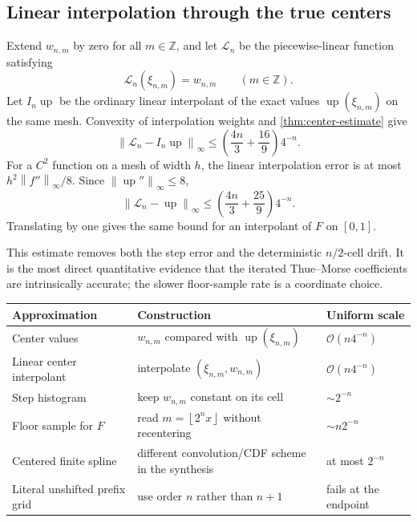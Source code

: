 \documentclass[11pt,oneside]{article}
\theoremstyle{definition}
\theoremstyle{remark}
\newcommand{\Z}{\mathbb Z}
\newcommand{\Up}{\operatorname{up}}
\newcommand{\bigO}{\mathcal O}
\newcommand{\norm}[1]{\left\lVert #1\right\rVert}
\newcommand{\floor}[1]{\left\lfloor #1\right\rfloor}
\begin{document}
\subsection{Linear interpolation through the true centers}

Extend $w_{n,m}$ by zero for all $m\in\Z$, and let $\mathcal L_n$ be the
piecewise-linear function satisfying
\begin{equation}
 \mathcal L_n(\xi_{n,m})=w_{n,m}
 \qquad(m\in\Z).                                          \label{eq:linear-interpolant}
\end{equation}
Let $I_n\Up$ be the ordinary linear interpolant of the exact values
$\Up(\xi_{n,m})$ on the same mesh.  Convexity of interpolation weights and
\cref{thm:center-estimate} give
\begin{equation*}
 \norm{\mathcal L_n-I_n\Up}_\infty
 \le\left(\frac{4n}{3}+\frac{16}{9}\right)4^{-n}.
\end{equation*}
For a $C^2$ function on a mesh of width $h$, the linear interpolation error is at
most $h^2\norm{f''}_\infty/8$.  Since $\norm{\Up''}_\infty\le8$,
\begin{equation}
 \boxed{\displaystyle
 \norm{\mathcal L_n-\Up}_\infty
 \le\left(\frac{4n}{3}+\frac{25}{9}\right)4^{-n}.}        \label{eq:linear-rate}
\end{equation}
Translating by one gives the same bound for an interpolant of $F$ on $[0,1]$.

This estimate removes both the step error and the deterministic $n/2$-cell
drift.  It is the most direct quantitative evidence that the iterated
Thue--Morse coefficients are intrinsically accurate; the slower floor-sample
rate is a coordinate choice.

\begin{center}
\begin{tabularx}{0.96\textwidth}{@{}l>{\raggedright\arraybackslash}Xl@{}}
\toprule
Approximation & Construction & Uniform scale\\
\midrule
Center values & $w_{n,m}$ compared with $\Up(\xi_{n,m})$ & $\bigO(n4^{-n})$\\
Linear center interpolant & interpolate $(\xi_{n,m},w_{n,m})$ & $\bigO(n4^{-n})$\\
Step histogram & keep $w_{n,m}$ constant on its cell & $\sim2^{-n}$\\
Floor sample for $F$ & read $m=\floor{2^n x}$ without recentering & $\sim n2^{-n}$\\
Centered finite spline & different convolution/CDF scheme in the synthesis & at most $2^{-n}$\\
Literal unshifted prefix grid & use order $n$ rather than $n+1$ & fails at the endpoint\\
\bottomrule
\end{tabularx}
\end{center}
\end{document}
